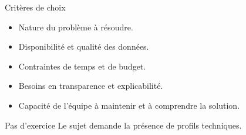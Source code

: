 \begin{frame}{Critères de choix}
\begin{itemize}
    \item Nature du problème à résoudre.
    \item Disponibilité et qualité des données.
    \item Contraintes de temps et de budget.
    \item Besoins en transparence et explicabilité.
    \item Capacité de l'équipe à maintenir et à comprendre la solution.
\end{itemize}
\end{frame}


\begin{frame}{Pas d'exercice}
  Le sujet demande la présence de profils techniques.
\end{frame}


